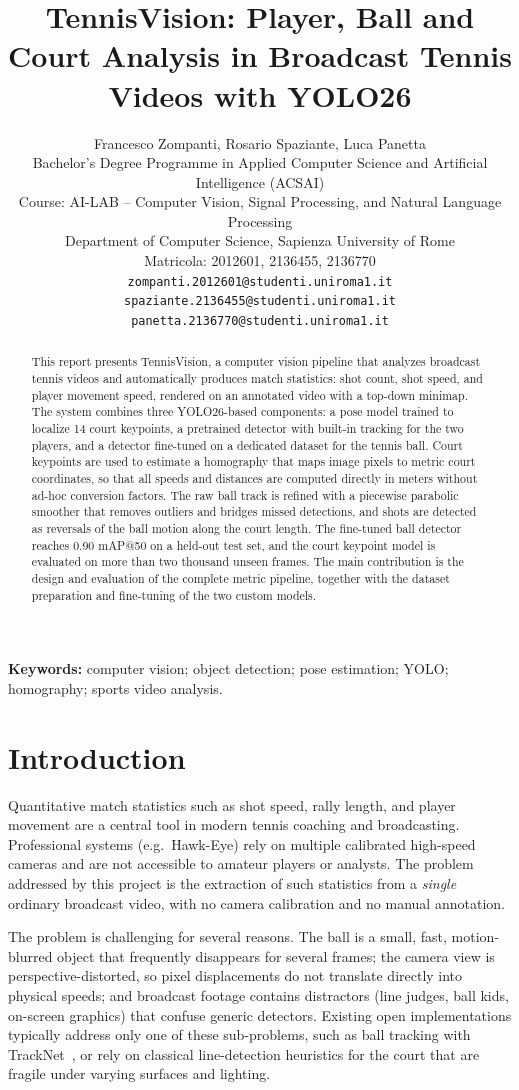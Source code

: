 \documentclass[10pt,twocolumn,a4paper]{article}
\title{\textbf{TennisVision: Player, Ball and Court Analysis in Broadcast Tennis Videos with YOLO26}}
\author{
	Francesco Zompanti, Rosario Spaziante, Luca Panetta\\
	Bachelor's Degree Programme in Applied Computer Science and Artificial Intelligence (ACSAI)\\
	Course: AI-LAB -- Computer Vision, Signal Processing, and Natural Language Processing\\
	Department of Computer Science, Sapienza University of Rome\\
	Matricola: 2012601, 2136455, 2136770\\
	\texttt{zompanti.2012601@studenti.uniroma1.it}\\
	\texttt{spaziante.2136455@studenti.uniroma1.it}\\
	\texttt{panetta.2136770@studenti.uniroma1.it}
}
\date{}
\begin{document}
	\maketitle

	\begin{abstract}
		This report presents TennisVision, a computer vision pipeline that analyzes broadcast tennis videos and automatically produces match statistics: shot count, shot speed, and player movement speed, rendered on an annotated video with a top-down minimap. The system combines three YOLO26-based components: a pose model trained to localize 14 court keypoints, a pretrained detector with built-in tracking for the two players, and a detector fine-tuned on a dedicated dataset for the tennis ball. Court keypoints are used to estimate a homography that maps image pixels to metric court coordinates, so that all speeds and distances are computed directly in meters without ad-hoc conversion factors. The raw ball track is refined with a piecewise parabolic smoother that removes outliers and bridges missed detections, and shots are detected as reversals of the ball motion along the court length. The fine-tuned ball detector reaches 0.90 mAP@50 on a held-out test set, and the court keypoint model is evaluated on more than two thousand unseen frames. The main contribution is the design and evaluation of the complete metric pipeline, together with the dataset preparation and fine-tuning of the two custom models.
	\end{abstract}

	\noindent\textbf{Keywords:} computer vision; object detection; pose estimation; YOLO; homography; sports video analysis.

	\section{Introduction}

	Quantitative match statistics such as shot speed, rally length, and player movement are a central tool in modern tennis coaching and broadcasting. Professional systems (e.g.\ Hawk-Eye) rely on multiple calibrated high-speed cameras and are not accessible to amateur players or analysts. The problem addressed by this project is the extraction of such statistics from a \emph{single} ordinary broadcast video, with no camera calibration and no manual annotation.

	The problem is challenging for several reasons. The ball is a small, fast, motion-blurred object that frequently disappears for several frames; the camera view is perspective-distorted, so pixel displacements do not translate directly into physical speeds; and broadcast footage contains distractors (line judges, ball kids, on-screen graphics) that confuse generic detectors. Existing open implementations typically address only one of these sub-problems, such as ball tracking with TrackNet~\cite{huang2019tracknet}, or rely on classical line-detection heuristics for the court that are fragile under varying surfaces and lighting.
\end{document}
